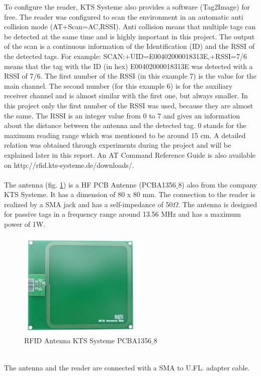 To configure the reader, KTS Systeme also provides a software (Tag2Image) for free. The reader was configured to scan the environment in an automatic anti collision mode (AT+Scan=AC,RSSI). Anti collision means that multiple tags can be detected at the same time and is highly important in this project. The output of the scan is a continuous information of the Identification (ID) and the RSSI of the detected tags. For example: SCAN:+UID=E00402000018313E,+RSSI=7/6 means that the tag with the ID (in hex) E00402000018313E was detected with a RSSI of 7/6. The first number of the RSSI (in this example 7) is the value for the main channel. The second number (for this example 6) is for the auxiliary receiver channel and is almost similar with the first one, but always smaller. In this project only the first number of the RSSI was used, because they are almost the same. The RSSI is an integer value from 0 to 7 and gives an information about the distance between the antenna and the detected tag. 0 stands for the maximum reading range which was mentioned to be around 15 cm. A detailed relation was obtained through experiments during the project and will be explained later in this report. An AT Command Reference Guide is also available on http://rfid.kts-systeme.de/downloads/.\\
\\
The antenna (fig. \ref{Antenna}) is a HF PCB Antenne (PCBA1356$\_$8) also from the company KTS Systeme. It has a dimension of 80 x 80 mm. The connection to the reader is realized by a SMA jack and has a self-impedance of 50$\Omega$. The antenna is designed for passive tags in a frequency range around 13.56 MHz and has a maximum power of 1W. \\
\begin{figure}[!htbp]
\centering
\includegraphics[width = 6cm]{Pictures/Antenna}
\caption{RFID Antenna KTS Systeme PCBA1356$\_$8}
\label{Antenna}
\end{figure}\\
The antenna and the reader are connected with a SMA to U.FL. adapter cable.\\

